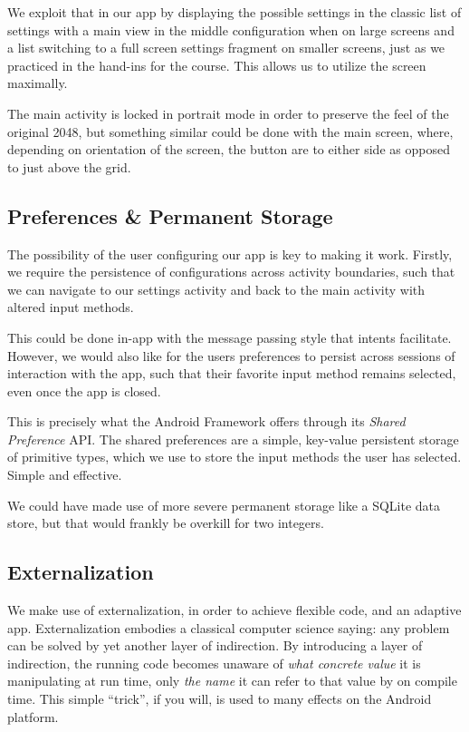 \documentclass[a4paper, 12pt]{article}
\begin{document}
We exploit that in our app by displaying the possible settings in the
classic list of settings with a main view in the middle configuration
when on large screens and a list switching to a full screen settings
fragment on smaller screens, just as we practiced in the hand-ins for
the course. This allows us to utilize the screen maximally.

The main activity is locked in portrait mode in order to preserve the
feel of the original 2048, but something similar could be done with
the main screen, where, depending on orientation of the screen, the
button are to either side as opposed to just above the grid.

\subsection{Preferences \& Permanent Storage}
The possibility of the user configuring our app is key to making it
work. Firstly, we require the persistence of configurations across
activity boundaries, such that we can navigate to our settings
activity and back to the main activity with altered input methods.

This could be done in-app with the message passing style that intents
facilitate. However, we would also like for the users preferences to
persist across sessions of interaction with the app, such that their
favorite input method remains selected, even once the app is closed.

This is precisely what the Android Framework offers through its
\emph{Shared Preference} API. The shared preferences are a simple,
key-value persistent storage of primitive types, which we use to store
the input methods the user has selected. Simple and effective.

We could have made use of more severe permanent storage like a SQLite
data store, but that would frankly be overkill for two integers.

\subsection{Externalization}
We make use of externalization, in order to achieve flexible code, and
an adaptive app. Externalization embodies a classical computer science
saying: any problem can be solved by yet another layer of
indirection. By introducing a layer of indirection, the running code
becomes unaware of \emph{what concrete value} it is manipulating at
run time, only \emph{the name} it can refer to that value by on
compile time. This simple ``trick'', if you will, is used to many
effects on the Android platform. 
\end{document}
